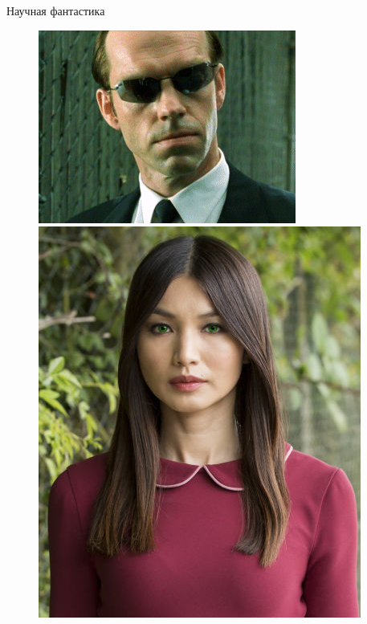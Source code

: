 \documentclass[10pt]{beamer}
\begin{document}
\begin{frame} {Научная фантастика}
\begin{figure}
\begin{minipage}{.33\textwidth}
\begin{minipage}{\textwidth}
			\end{minipage}
			\begin{minipage}{\textwidth}
			  \includegraphics[width=0.9 \linewidth, height=0.9 \textheight, keepaspectratio]{images/smith}
			\end{minipage}
		\end{minipage}%
		\begin{minipage}{.33\textwidth}
		  \includegraphics[width=0.9 \linewidth, height=0.9 \textheight, keepaspectratio]{images/mia}
		\end{minipage}
	\end{figure}
\end{frame}
\end{document}
